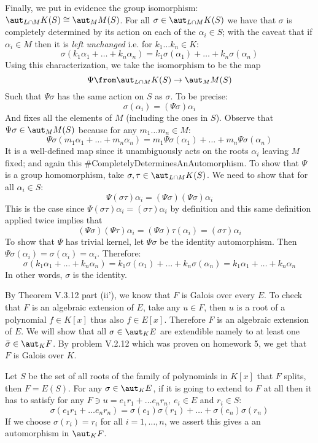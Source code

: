 Finally, we put in evidence the group isomorphism: $\aut_{L\cap M} K(S) \cong \aut_MM(S)$. 
For all $\sigma \in \aut_{L\cap M} K(S)$ we have that $\sigma$ is completely determined by its action on each of the $\alpha_i \in S$; with the caveat that if $\alpha_i \in M$ then it is \emph{left unchanged} i.e. for $k_1\ldots k_n \in K$:
$$\sigma(k_1 \alpha_1+\ldots + k_n \alpha_n) = k_1 \sigma(\alpha_1)+\ldots +  k_n \sigma(\alpha_n)$$
Using this characterization, we take the isomorphism to be the map 
$$\Psi \from \aut_{L\cap M} K(S) \to \aut_MM(S)$$
Such that  $\Psi\sigma$ has the same action on $S$ as $\sigma$. To be precise:
$$\sigma(\alpha_i)=(\Psi\sigma)\alpha_i$$
And fixes all the elements of $M$ (including the ones in $S$). Observe that $\Psi\sigma\in \aut_MM(S)$ because for any $m_1\ldots m_n \in M$:
$$\Psi\sigma(m_1 \alpha_1+\ldots + m_n \alpha_n) = m_1 \Psi\sigma(\alpha_1)+\ldots +  m_n \Psi\sigma(\alpha_n)$$
It is a well-defined map since it unambiguously acts on the roots $\alpha_i$ leaving $M$ fixed; and again this \#CompletelyDeterminesAnAutomorphism.
To show that $\Psi$ is a group homomorphism, take $\sigma, \tau\in   \aut_{L\cap M} K(S)$. We need to show that for all $\alpha_i \in S$:
$$\Psi(\sigma \tau)\alpha_i= (\Psi\sigma)(\Psi\sigma)\alpha_i$$   
This is the case since $\Psi(\sigma \tau)\alpha_i =(\sigma\tau)\alpha_i$ by definition and this same definition applied twice implies that 
$$(\Psi\sigma)(\Psi\tau)\alpha_i=(\Psi\sigma)\tau (\alpha_i)=(\sigma\tau)\alpha_i$$
To show that $\Psi$ has trivial kernel, let $\Psi\sigma$ be the identity automorphism. Then $\Psi\sigma(\alpha_i) = \sigma(\alpha_i)=\alpha_i$. Therefore: 
$$\sigma(k_1 \alpha_1+\ldots + k_n \alpha_n) = k_1 \sigma(\alpha_1)+\ldots +  k_n \sigma(\alpha_n)=k_1 \alpha_1+\ldots + k_n \alpha_n$$
In other words, $\sigma$ is the identity.

By Theorem V.3.12 part (ii'), we know that $F$ is Galois over every $E$. To check that $F$ is an algebraic extension of $E$, take any $u\in F$, then $u$ is a root of a polynomial  $f\in K[x]$ thus also  $f\in E[x]$. Therefore $F$ is an algebraic extension of $E$.
We will show that all $\sigma\in \aut_KE$ are extendible namely to at least one $\bar\sigma \in \aut_K F$. By problem V.2.12 which was proven on homework 5, we get that $F$ is Galois over $K$.

Let $S$ be the set of all roots of the family of polynomials in $K[x]$ that $F$ splits, then $F=E(S)$. 
For any $\sigma\in \aut_KE$, if it is going to extend to $F$ at all then it has to satisfy for any $F\ni u=e_1 r_1 + \ldots e_n r_n,\ e_i\in E$ and $r_i\in S$:
$$\sigma(e_1 r_1 + \ldots e_n r_n)=\sigma(e_1) \sigma(r_1) + \ldots +\sigma(e_n) \sigma(r_n)$$
If we choose $\sigma(r_i)=r_i$ for all $i=1,\ldots,n$, we assert this gives a an automorphism in $\aut_KF$.
